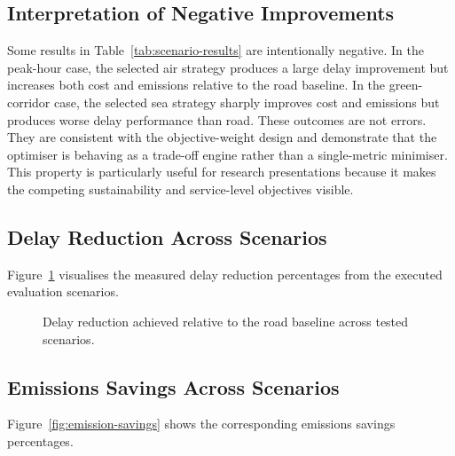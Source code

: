 \subsection{Interpretation of Negative Improvements}
Some results in Table~\ref{tab:scenario-results} are intentionally negative. In the peak-hour case, the selected air strategy produces a large delay improvement but increases both cost and emissions relative to the road baseline. In the green-corridor case, the selected sea strategy sharply improves cost and emissions but produces worse delay performance than road. These outcomes are not errors. They are consistent with the objective-weight design and demonstrate that the optimiser is behaving as a trade-off engine rather than a single-metric minimiser. This property is particularly useful for research presentations because it makes the competing sustainability and service-level objectives visible.

\subsection{Delay Reduction Across Scenarios}
Figure~\ref{fig:delay-reduction} visualises the measured delay reduction percentages from the executed evaluation scenarios.

\begin{figure}[htbp]
\centering
{}
\caption{Delay reduction achieved relative to the road baseline across tested scenarios.}
\label{fig:delay-reduction}
\end{figure}

\subsection{Emissions Savings Across Scenarios}
Figure~\ref{fig:emission-savings} shows the corresponding emissions savings percentages.

